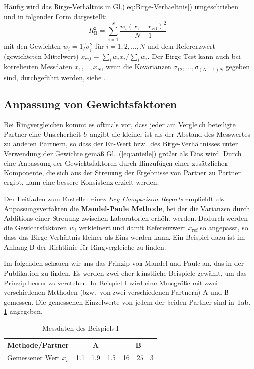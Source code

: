 Häufig wird das Birge-Verhältnis in Gl.(\ref{eq:Birge-Verhaeltnis}) 
umgeschrieben und in folgender Form dargestellt:
\begin{equation}
R_\mathrm{B}^2 = \sum_{i=1}^N \frac{w_i (x_i - x_\mathrm{ref})^2}{N-1}
\end{equation}
mit den Gewichten $w_i = 1/\sigma_i^2$ für $i=1,2,\ldots, N$ und dem 
Referenzwert (gewichteten Mittelwert) $x_{ref}=\sum_i w_i x_i / \sum_i w_i$.
Der Birge Test kann auch bei korrelierten Messdaten $x_1,\ldots ,x_N$, wenn die 
Kovarianzen $\sigma_{12},\ldots, \sigma_{(N-1)N}$ gegeben sind, durchgeführt werden, siehe \cite{Kac08}.

\subsection{Anpassung von Gewichtsfaktoren}

Bei Ringvergleichen kommt es oftmals vor, dass jeder am Vergleich beteiligte Partner eine
Unsicherheit $U$ angibt die kleiner ist als der Abstand des Messwertes zu anderen Partnern,
so dass der En-Wert bzw.\ des Birge-Verhältnisses unter Verwendung der Gewichte gemäß Gl.~(\ref{eq:anteile})
größer als Eins wird. Durch eine Anpassung der Gewichtsfaktoren durch Hinzufügen einer
zusätzlichen Komponente, die sich aus der Streuung der Ergebnisse von Partner zu Partner ergibt,
kann eine bessere Konsistenz erzielt werden.

Der Leitfaden zum Erstellen eines \textsl{Key Comparison Reports}
\cite{GuideKey} empfiehlt als Anpassungsverfahren die \textbf{Mandel-Paule Methode},
bei der die Varianzen durch Additions einer Streuung zwischen Laboratorien
erhöht werden. Dadurch werden die Gewichtsfaktoren $w_i$ verkleinert und damit Referenzwert 
$x_\mathrm{ref}$ so angepasst, so dass das Birge-Verhältnis kleiner als Eins werden kann.
Ein Beispiel dazu ist im Anhang B der Richtlinie für Ringvergleiche \cite{GuideKey} zu finden.

Im folgenden schauen wir uns das Prinzip von Mandel und Paule an, das 
in der Publikation \cite{Pau82} zu finden. Es werden zwei eher künstliche Beispiele gewählt, um das Prinzip besser zu verstehen. 
In Beispiel I wird eine Messgröße mit zwei verschiedenen Methoden (bzw.\ von zwei verschiedenen Partnern) A und B gemessen.
Die gemessenen Einzelwerte von jedem der beiden Partner sind in Tab. \ref*{tab:Beispiel_I}
angegeben.
\begin{table}[!htb]
	\caption{Messdaten des Beispiels I}
	\begin{center}
	\begin{tabular}{l| rrr |rrr}
		\hline 
		Methode/Partner & \multicolumn{3}{c}{A} \vline & \multicolumn{3}{c}{B} \\ \hline
		Gemessener Wert $x_i$ & 1.1 & 1.9 & 1.5 & 16 & 25 & 3 \\ \hline
	\end{tabular}
\end{center}
\label{tab:Beispiel_I}
\end{table}

